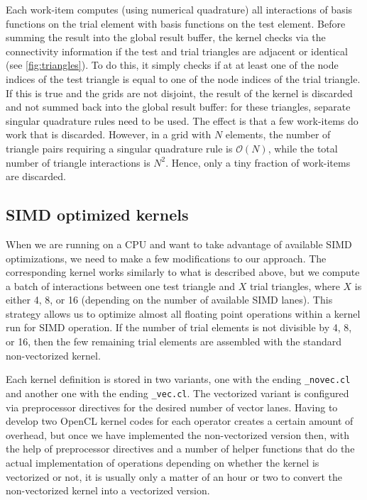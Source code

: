 \documentclass{IEEEcsmag}
\begin{document}
Each work-item computes (using numerical quadrature) all interactions of basis functions on the trial element with basis functions on the test element. Before summing the result into the global result buffer, the kernel checks via the connectivity information if the test and trial triangles are adjacent or identical (see \cref{fig:triangles}). To do this, it simply checks if at at least one of the node indices of the test triangle is equal to one of the node indices of the trial triangle. If this is true and the grids are not disjoint, the result of the kernel is discarded and not summed back into the global result buffer: for these triangles, separate singular quadrature rules need to be used. The effect is that a few work-items do work that is discarded. However, in a grid with $N$ elements, the number of triangle pairs requiring a singular quadrature rule is $\mathcal{O}(N)$, while the total number of triangle interactions is $N^2$. Hence, only a tiny fraction of work-items are discarded.

\subsection{SIMD optimized kernels}
When we are running on a CPU and want to take advantage of available SIMD optimizations, we need to make a few modifications to our approach. The corresponding kernel works similarly to what is described above, but we compute a batch of interactions between one test triangle and $X$ trial triangles, where $X$ is either 4, 8, or 16 (depending on the number of available SIMD lanes). This strategy allows us to optimize almost all floating point operations within a kernel run for SIMD operation. If the number of trial elements is not divisible by 4, 8, or 16, then the few remaining trial elements are assembled with the standard non-vectorized kernel.

Each kernel definition is stored in two variants, one with the ending \texttt{\_novec.cl} and another one with the ending \texttt{\_vec.cl}. The vectorized variant is configured via preprocessor directives for the desired number of vector lanes. Having to develop two OpenCL kernel codes for each operator creates a certain amount of overhead, but once we have implemented the non-vectorized version then, with the help of preprocessor directives and a number of helper functions that do the actual implementation of operations depending on whether the kernel is vectorized or not, it is usually only a matter of an hour or two to convert the non-vectorized kernel into a vectorized version.
\end{document}
